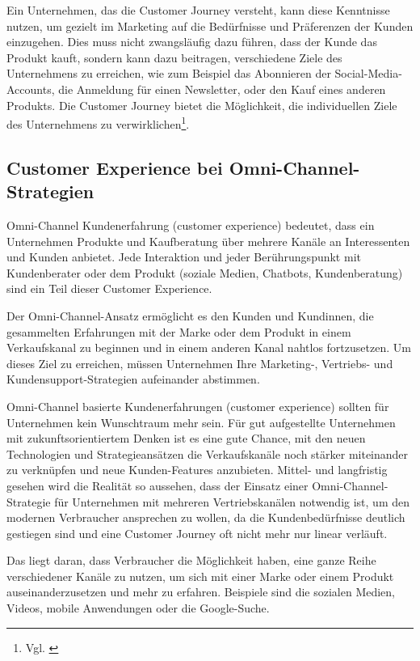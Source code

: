 Ein Unternehmen, das die Customer Journey versteht, kann diese Kenntnisse nutzen, um gezielt im Marketing auf die Bedürfnisse und Präferenzen der Kunden einzugehen. Dies muss nicht zwangsläufig dazu führen, dass der Kunde das Produkt kauft, sondern kann dazu beitragen, verschiedene Ziele des Unternehmens zu erreichen, wie zum Beispiel das Abonnieren der Social-Media-Accounts, die Anmeldung für einen Newsletter, oder den Kauf eines anderen Produkts. Die Customer Journey bietet die Möglichkeit, die individuellen Ziele des Unternehmens zu verwirklichen\footnote{Vgl. \autocite [Online] {Gutmann2020}}.

\subsection{Customer Experience bei Omni-Channel-Strategien}\label{unterabschnitt_3_3}
Omni-Channel Kundenerfahrung (customer experience) bedeutet, dass ein Unternehmen Produkte und Kaufberatung über mehrere Kanäle an Interessenten und Kunden anbietet.
\newline
Jede Interaktion und jeder Berührungspunkt mit Kundenberater oder dem Produkt (soziale Medien, Chatbots, Kundenberatung) sind ein Teil dieser Customer Experience.
\newline

Der Omni-Channel-Ansatz ermöglicht es den Kunden und Kundinnen, die gesammelten Erfahrungen mit der Marke oder dem Produkt in einem Verkaufskanal zu beginnen und in einem anderen Kanal nahtlos fortzusetzen. Um dieses Ziel zu erreichen, müssen Unternehmen Ihre Marketing-, Vertriebs- und Kundensupport-Strategien aufeinander abstimmen.
\newline

Omni-Channel basierte Kundenerfahrungen (customer experience) sollten für Unternehmen kein Wunschtraum mehr sein. Für gut aufgestellte Unternehmen mit zukunftsorientiertem Denken ist es eine gute Chance, mit den neuen Technologien und Strategieansätzen die Verkaufskanäle noch stärker miteinander zu verknüpfen und neue Kunden-Features anzubieten. Mittel- und langfristig gesehen wird die Realität so aussehen, dass der Einsatz einer Omni-Channel-Strategie für Unternehmen mit mehreren Vertriebskanälen notwendig ist, um den modernen Verbraucher ansprechen zu wollen, da die Kundenbedürfnisse deutlich gestiegen sind und eine Customer Journey oft nicht mehr nur linear verläuft.
\newline

Das liegt daran, dass Verbraucher die Möglichkeit haben, eine ganze Reihe verschiedener Kanäle zu nutzen, um sich mit einer Marke oder einem Produkt auseinanderzusetzen und mehr zu erfahren. Beispiele sind die sozialen Medien, Videos, mobile Anwendungen oder die Google-Suche.
\newline

